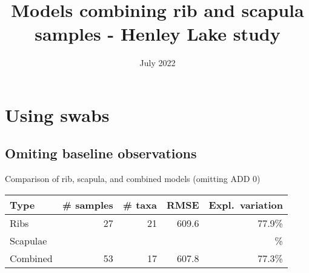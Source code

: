\documentclass{beamer}
\title[]{Models combining rib and scapula samples - Henley Lake study}
\date{July 2022}
\begin{document}
\begin{frame}
   \titlepage
\end{frame}












\section{Using swabs}


\subsection{Omiting baseline observations}

\begin{frame}{Comparison of rib, scapula, and combined models (omitting ADD 0)}

  \begin{tabular}{lrrrr}
    Type & \# samples & \# taxa & RMSE & Expl.\ variation\\ \hline
    Ribs & 27 & 21 & 609.6 & 77.9\% \\
    Scapulae &  &  &  &  \% \\
    Combined & 53 & 17 & 607.8 & 77.3\%
  \end{tabular}
  
  \vspace{0.1in}

\end{frame}


\end{document}
